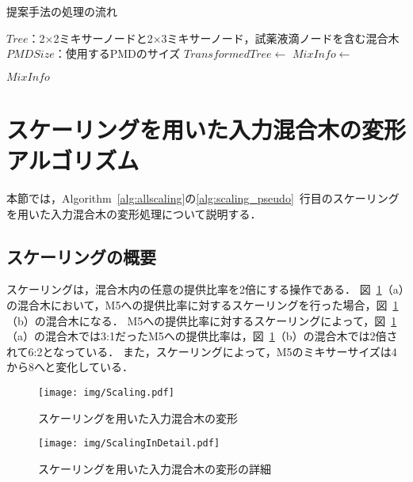 \begin{algorithm}[tbp]
 \caption{提案手法の処理の流れ}\label{alg:allscaling}
 \begin{algorithmic}[1]
     \Require $\mathit{Tree}$：2$\times$2ミキサーノードと2$\times$3ミキサーノード，試薬液滴ノードを含む混合木
     \Require $\mathit{PMDSize}$：使用するPMDのサイズ
     \State $\mathit{TransformedTree} \gets$  \label{alg:scaling_pseudo}
     \State $\mathit{MixInfo \gets}$  \label{alg:samplepreparation_pseudo}

      \Return $\mathit{MixInfo}$
 \end{algorithmic}
\end{algorithm}

\section{スケーリングを用いた入力混合木の変形アルゴリズム}
本節では，Algorithm~\ref{alg:allscaling}の\ref{alg:scaling_pseudo}~行目のスケーリングを用いた入力混合木の変形処理について説明する．
\subsection{スケーリングの概要}\label{sec:ScalingAbout}
スケーリングは，混合木内の任意の提供比率を2倍にする操作である．
図~\ref{fig:Scaling}（a）の混合木において，M5への提供比率に対するスケーリングを行った場合，図~\ref{fig:Scaling}（b）の混合木になる．
M5への提供比率に対するスケーリングによって，図~\ref{fig:Scaling}（a）の混合木では3:1だったM5への提供比率は，図~\ref{fig:Scaling}（b）の混合木では2倍されて6:2となっている．
また，スケーリングによって，M5のミキサーサイズは4から8へと変化している．

\begin{figure}[tbp]
 \centering\texttt{[image: img/Scaling.pdf]}
 \caption{スケーリングを用いた入力混合木の変形}\label{fig:Scaling}
\end{figure}

\begin{figure}[tbp]
 \centering\texttt{[image: img/ScalingInDetail.pdf]}
 \caption{スケーリングを用いた入力混合木の変形の詳細}\label{fig:ScalingInDetail}
\end{figure}

